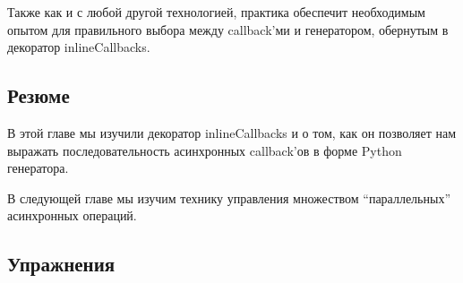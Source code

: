 Также как и с любой другой технологией, 
практика обеспечит необходимым опытом для правильного выбора между 
callback'ми и генератором, обернутым в декоратор inlineCallbacks.


\subsection{Резюме}

В этой главе мы изучили декоратор inlineCallbacks и о том, как 
он позволяет нам выражать последовательность 
асинхронных callback'ов в форме Python генератора.


В следующей главе мы изучим технику управления 
множеством ``параллельных'' асинхронных операций.


\subsection{Упражнения}

